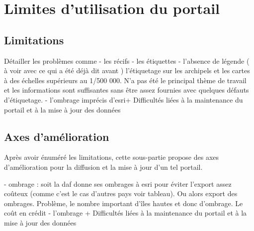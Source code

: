\section{Limites d'utilisation du portail}

\subsection {Limitations}
{\color{magenta} Détailler les problèmes  comme 
- les récifs
- les étiquettes
- l'absence de légende ( à voir avec ce qui a été déjà dit avant )
l'étiquetage sur les archipels et les cartes à des échelles supérieurs au 1/500 000. N'a pas été le principal thème de travail et les informations sont suffisantes sans être assez fournies avec quelques défauts d'étiquetage.
- l'ombrage imprécis d'esri+ Difficultés liées à la maintenance du portail et à la mise à jour des données}

\subsection {Axes d'amélioration}
Après avoir énuméré les limitations, cette sous-partie propose des axes d'amélioration pour la diffusion et la mise à jour d'un tel portail. 
{\color{magenta} 

- ombrage : soit la daf donne ses ombrages à esri pour éviter l'export assez coûteux (comme c'est le cas d'autres pays voir tableau). Ou alors export des ombrages. Problème, le nombre important d'îles hautes et donc d'ombrage. Le coût en crédit
- l'ombrage + Difficultés liées à la maintenance du portail et à la mise à jour des données}